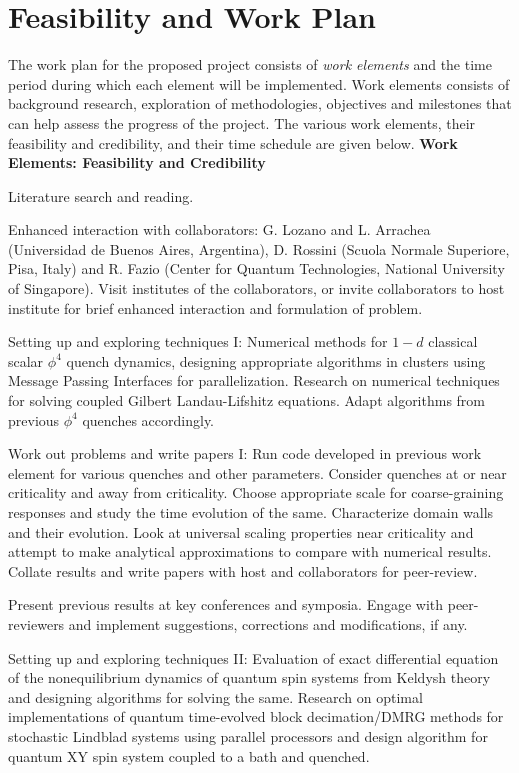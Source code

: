 \documentclass[a4paper,11pt,color]{article}
\begin{document}
\section{Feasibility and Work  Plan}
\label{sec:feasibility}
The work plan for the proposed project consists of \textit{work elements} and the time period during which each element will be implemented. Work elements consists of background research, exploration of methodologies, objectives and milestones that can help assess the progress of the project. The various work elements, their feasibility and credibility, and their time schedule are given below.
\textbf{Work Elements: Feasibility and Credibility}
\begin{enumerate}{
\item
Literature search and reading.
\item
Enhanced interaction with collaborators: G. Lozano and L. Arrachea (Universidad de Buenos Aires, Argentina), D. Rossini (Scuola Normale Superiore, Pisa, Italy) and R. Fazio (Center for Quantum Technologies, National University of Singapore). Visit institutes of the collaborators, or invite collaborators to host institute for brief enhanced interaction and formulation of problem.
\item
Setting up and exploring techniques I: Numerical methods for $1-d$ classical scalar $\phi^4$ quench dynamics, designing appropriate algorithms in clusters using Message Passing Interfaces for parallelization. Research on numerical techniques for solving coupled Gilbert Landau-Lifshitz equations. Adapt algorithms from previous $\phi^4$ quenches  accordingly.
\item
Work out problems and write papers I: Run code developed in previous work element for various quenches and other parameters. Consider quenches at or near criticality and away from criticality. Choose appropriate scale for coarse-graining responses and study the time evolution of the same. Characterize domain walls and their evolution. Look at universal scaling properties near criticality and attempt to make analytical approximations to compare with numerical results. Collate results and write papers with host and collaborators for peer-review.
\item
Present previous results at key conferences and symposia. Engage with peer-reviewers and implement suggestions, corrections and modifications, if any.
\item
Setting up and exploring techniques II: Evaluation of exact differential equation of the nonequilibrium dynamics of quantum spin systems from Keldysh theory and designing algorithms for solving the same. Research on optimal implementations of quantum time-evolved block decimation/DMRG methods for stochastic Lindblad systems using parallel processors and design algorithm for quantum XY spin system coupled to a bath and quenched.
}
\end{enumerate}
\end{document}
